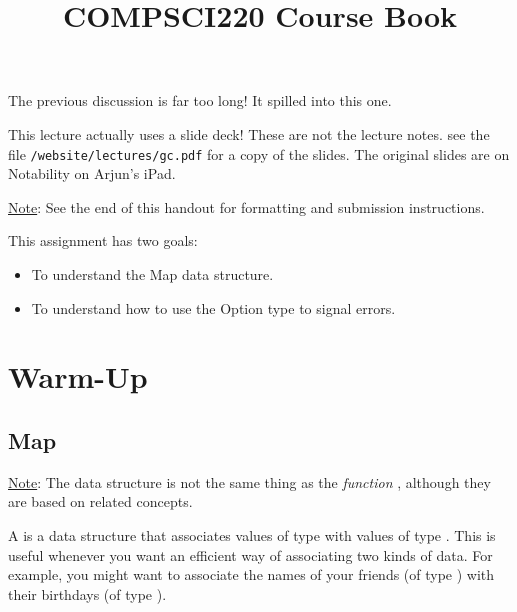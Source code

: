 \documentclass[9pt]{extbook}
\title{COMPSCI220 Course Book}
\begin{document}
\maketitle
\tableofcontents


















The previous discussion is far too long! It spilled into this one.



\newlecture

This lecture actually uses a slide deck! These are not the lecture notes.
see the file \texttt{/website/lectures/gc.pdf} for a copy of the slides.
The original slides are on Notability on Arjun's iPad.






\underline{Note}: See the end of this handout for formatting and submission instructions.

This assignment has two goals:

\begin{itemize}
  \item To understand the Map data structure.
  \item To understand how to use the Option type to signal errors.
\end{itemize}

\section{Warm-Up}

\subsection{Map}

\underline{Note}: The data structure  is not the same thing as the \emph{function} , although they are based on related concepts.

A  is a data structure that associates values of type  with values of type .  This is useful whenever you want an efficient way of associating two kinds of data.  For example, you might want to associate the names of your friends (of type ) with their birthdays (of type ).
\end{document}
